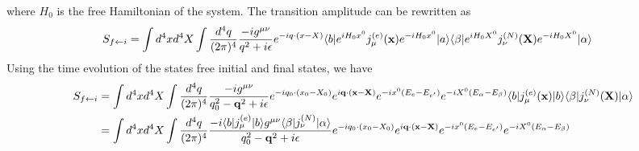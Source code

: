 where \(H_0\) is the free Hamiltonian of the system. The transition amplitude can be rewritten as
\begin{align}
    S_{f\leftarrow i} & = \int d^4x d^4 X \int \frac{d^4 q}{(2\pi)^4} \frac{-i g^{\mu\nu}}{q^2 + i\epsilon} e^{-i q \cdot (x - X)} \langle b|e^{i H_0 x^0} j^{(e)}_{\mu}({\bf x}) e^{-i H_0 x^0}|a\rangle \langle \beta|e^{i H_0 X^0} j^{(N)}_{\nu}({\bf X}) e^{-i H_0 X^0}|\alpha\rangle
\end{align}
Using the time evolution of the states free initial and final states, we have
\begin{align}
    S_{f\leftarrow i} & =  \int d^4x d^4 X \int \frac{d^4 q}{(2\pi)^4} \frac{-i g^{\mu\nu}}{q_0^2 -{\bf q}^2+ i\epsilon} e^{-i q_0 \cdot (x_0 - X_0)} e^{i{\bf q}\cdot({\bf x} - {\bf X})} e^{-ix^0(E_e-E_{e'})}e^{-iX^0(E_\alpha-E_{\beta})} \langle b| j^{(e)}_{\mu} ({\bf x})|b\rangle \langle \beta| j^{(N)}_{\nu}({\bf X}) |\alpha\rangle\nonumber \\
                      & =\int d^4x d^4 X \int \frac{d^4 q}{(2\pi)^4} \frac{-i\langle b| j^{(e)}_{\mu} |b\rangle  g^{\mu\nu}\langle \beta| j^{(N)}_{\nu} |\alpha\rangle}{q_0^2 -{\bf q}^2+ i\epsilon} e^{-i q_0 \cdot (x_0 - X_0)} e^{i{\bf q}\cdot({\bf x} - {\bf X})} e^{-ix^0(E_e-E_{e'})}e^{-iX^0(E_\alpha-E_{\beta})}
\end{align}

